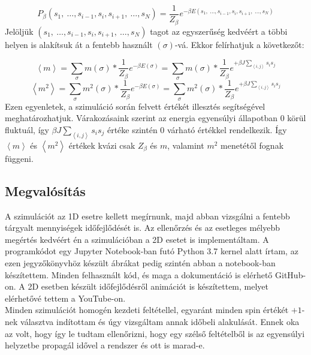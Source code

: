 \begin{equation} \label{eq:5}
    P_{\beta} \left( s_{1},\ \dots, s_{i-1}, s_{i} , s_{i+1},\ \dots, s_{N} \right)
    =
    \frac{1}{Z_{\beta}} e^{- \beta E \left( s_{1},\ \dots, s_{i-1}, s_{i} , s_{i+1},\ \dots, s_{N} \right)}
\end{equation}
Jelöljük $\left( s_{1},\ \dots, s_{i-1}, s_{i} , s_{i+1},\ \dots, s_{N} \right)$ tagot az egyszerűség kedvéért a többi helyen is alakítsuk át a fentebb használt $\left( \sigma \right)$-vá. Ekkor felírhatjuk a következőt:

\begin{equation} \label{eq:6}
    \left< m \right>
    =
    \sum_{\sigma} m \left( \sigma \right) * \frac{1}{Z_{\beta}} e^{- \beta E \left( \sigma \right)}
    =
    \sum_{\sigma} m \left( \sigma \right) * \frac{1}{Z_{\beta}} e^{+ \beta J \sum_{\left< i,j \right>} s_{i} s_{j}}
\end{equation}
\begin{equation} \label{eq:7}
    \left< m^{2} \right>
    =
    \sum_{\sigma} m^{2} \left( \sigma \right) * \frac{1}{Z_{\beta}} e^{- \beta E \left( \sigma \right)}
    =
    \sum_{\sigma} m^{2} \left( \sigma \right) * \frac{1}{Z_{\beta}} e^{+ \beta J \sum_{\left< i,j \right>} s_{i} s_{j}}
\end{equation}
Ezen egyenletek, a szimuláció során felvett értékét illesztés segítségével meghatározhatjuk. Várakozásaink szerint az energia egyensúlyi állapotban $0$ körül fluktuál, így $\beta J \sum_{\left< i,j \right>} s_{i} s_{j}$ értéke szintén $0$ várható értékkel rendelkezik. Így $\left< m \right>$ és $\left< m^{2} \right>$ értékek kvázi csak $Z_{\beta}$ és $m$, valamint $m^{2}$ menetétől fognak függeni.

\subsection{Megvalósítás}
A szimulációt az 1D esetre kellett megírnunk, majd abban vizsgálni a fentebb tárgyalt mennyiségek időfejlődését is. Az ellenőrzés és az esetleges mélyebb megértés kedvéért én a szimulációban a 2D esetet is implementáltam. A programkódot egy Jupyter Notebook-ban futó Python 3.7 kernel alatt írtam, az ezen jegyzőkönyvhöz készült ábrákat pedig szintén abban a notebook-ban készítettem. Minden felhasznált kód, és maga a dokumentáció is elérhető GitHub-on\cite{github}. A 2D esetben készült időfejlődésről animációt is készítettem, melyet elérhetővé tettem a YouTube-on\cite{yt}. \\
Minden szimulációt homogén kezdeti feltétellel, egyaránt minden spin értékét $+1$-nek választva indítottam és úgy vizsgáltam annak időbeli alakulását. Ennek oka az volt, hogy így le tudtam ellenőrizni, hogy egy szélső feltételből is az egyensúlyi helyzetbe propagál idővel a rendszer és ott is marad-e.


